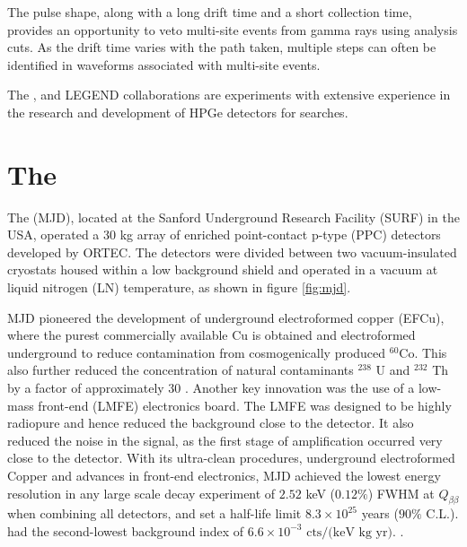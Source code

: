 The pulse shape, along with a long drift time and a short collection time, provides an opportunity to veto multi-site events from gamma rays using analysis cuts. As the drift time varies with the path taken, multiple steps can often be identified in waveforms associated with multi-site events.

The {\MJ}, {\Gerda} and LEGEND collaborations are experiments with extensive experience in the research and development of HPGe detectors for {\onbb} searches.


\section{The {\MJD}}
The {\MJD} (MJD), located at the Sanford Underground Research Facility (SURF) in the USA, operated a 30 kg array of enriched point-contact p-type (PPC) detectors developed by ORTEC. The detectors were divided between two vacuum-insulated cryostats housed within a low background shield and operated in a vacuum at liquid nitrogen (LN) temperature, as shown in figure \ref{fig:mjd}. 

MJD pioneered the development of underground electroformed copper (EFCu), where the purest commercially available Cu is obtained and electroformed underground to reduce contamination from cosmogenically produced $^{60}$Co. This also further reduced the concentration of natural contaminants $^{238}$ U and $^{232}$ Th by a factor of approximately 30 \cite{Abgrall:2016cct}. Another key innovation was the use of a low-mass front-end (LMFE) electronics board. The LMFE was designed to be highly radiopure and hence reduced the background close to the detector. It also reduced the noise in the signal, as the first stage of amplification occurred very close to the detector. With its ultra-clean procedures, underground electroformed Copper and advances in front-end electronics, MJD achieved the lowest energy resolution in any large scale {\onbb} decay experiment of $2.52$ keV ($0.12\%$) FWHM at $Q_{\beta\beta}$ when combining all detectors, and set a half-life limit $8.3 \times 10^{25}$ years ($90\%$ C.L.). {\MJD} had the second-lowest background index of $6.6 \times 10^{-3} \text{ cts/(keV kg yr)}$. \cite{Majorana_final}.

